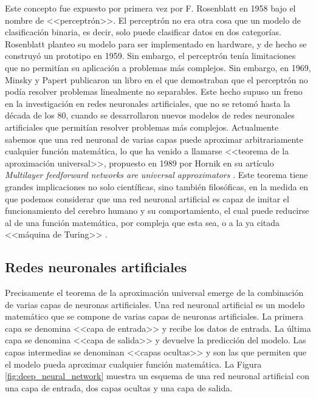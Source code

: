 Este concepto fue expuesto por primera vez por F. Rosenblatt en 1958 \citep{rothmanTransformersNaturalLanguage2021} bajo el nombre de <<perceptrón>>. El perceptrón no era otra cosa que un modelo de clasificación binaria, es decir, solo puede clasificar datos en dos categorías. Rosenblatt planteo su modelo para ser implementado en hardware, y de hecho se construyó un prototipo en 1959. Sin embargo, el perceptrón tenía limitaciones que no permitían su aplicación a problemas más complejos. Sin embargo, en 1969, Minsky y Papert publicaron un libro \citep{minsky1969perceptrons} en el que demostraban que el perceptrón no podía resolver problemas linealmente no separables. Este hecho supuso un freno en la investigación en redes neuronales artificiales, que no se retomó hasta la década de los 80, cuando se desarrollaron nuevos modelos de redes neuronales artificiales que permitían resolver problemas más complejos. Actualmente sabemos que una red neuronal de varias capas puede aproximar arbitrariamente cualquier función matemática, lo que ha venido a llamarse <<teorema de la aproximación universal>>, propuesto en 1989 por Hornik en su artículo \textit{Multilayer feedforward networks are universal approximators} \citep{hornikMultilayerFeedforwardNetworks1989}. Este teorema tiene grandes implicaciones no solo científicas, sino también filosóficas, en la medida en que podemos considerar que una red neuronal artificial es capaz de imitar el funcionamiento del cerebro humano y su comportamiento, el cual puede reducirse al de una función matemática, por compleja que esta sea, o a la ya citada <<máquina de Turing>> \citep{penroseNuevaMenteEmperador2015}.


\subsection{Redes neuronales artificiales}
Precisamente el teorema de la aproximación universal emerge de la combinación de varias capas de neuronas artificiales. Una red neuronal artificial es un modelo matemático que se compone de varias capas de neuronas artificiales. La primera capa se denomina <<capa de entrada>> y recibe los datos de entrada. La última capa se denomina <<capa de salida>> y devuelve la predicción del modelo. Las capas intermedias se denominan <<capas ocultas>> y son las que permiten que el modelo pueda aproximar cualquier función matemática. La Figura \ref{fig:deep_neural_network} muestra un esquema de una red neuronal artificial con una capa de entrada, dos capas ocultas y una capa de salida.

